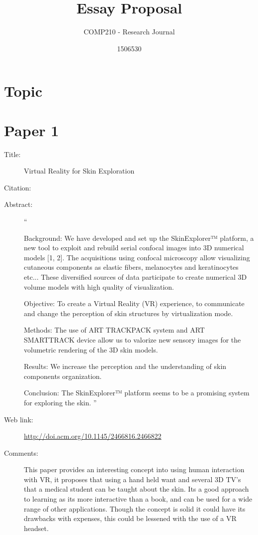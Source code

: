 \documentclass{scrartcl}
\title{Essay Proposal}
\subtitle{COMP210 - Research Journal}
\author{1506530}
\begin{document}
	
	
	\maketitle
	\section*{Topic}
	
	
	\section*{Paper 1}
	\begin{description}
		\item[Title:] Virtual Reality for Skin Exploration
		\item[Citation:] \cite{Vazquez}
		\item[Abstract:] ``
		
		Background: We have developed and set up the SkinExplorer™ platform, a new tool to exploit and rebuild serial confocal images into 3D numerical models [1, 2]. The acquisitions using confocal microscopy allow visualizing cutaneous components as elastic fibers, melanocytes and keratinocytes etc... These diversified sources of data participate to create numerical 3D volume models with high quality of visualization.
		
		Objective: To create a Virtual Reality (VR) experience, to communicate and change the perception of skin structures by virtualization mode.
		
		Methods: The use of ART TRACKPACK system and ART SMARTTRACK device allow us to valorize new sensory images for the volumetric rendering of the 3D skin models.
		
		Results: We increase the perception and the understanding of skin components organization.
		
		Conclusion: The SkinExplorer™ platform seems to be a promising system for exploring the skin.
		''
		\item[Web link:] \url{http://doi.acm.org/10.1145/2466816.2466822}
		\item[Comments:] This paper provides an interesting concept into using human interaction with VR, it proposes that using a hand held want and several 3D TV's that a medical student can be taught about the skin. Its a good approach to learning as its more interactive than a book, and can be used for a wide range of other applications. Though the concept is solid it could have its drawbacks with expenses, this could be lessened with the use of a VR headset. 
	\end{description}
	
\end{document}
